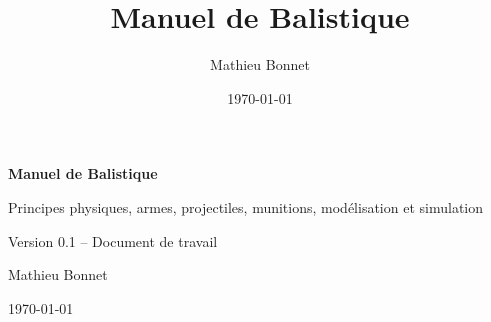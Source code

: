 \documentclass[a4paper,11pt]{book}
\title{Manuel de Balistique}
\author{Mathieu Bonnet}
\date{\today}
\begin{document}
\pagestyle{fancy}

\begin{titlepage}

\centering

\vspace*{4cm}

{\Huge\bfseries Manuel de Balistique\par}

\vspace{1cm}

{\Large Principes physiques, armes, projectiles,
munitions, modélisation et simulation\par}

\vfill

{\Large Version 0.1 -- Document de travail\par}

\vspace{1cm}

Mathieu Bonnet

\vspace{1cm}

\today

\end{titlepage}

\frontmatter


\tableofcontents

\listoffigures

\listoftables

\mainmatter









\end{document}
